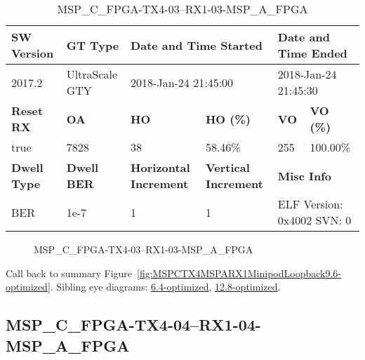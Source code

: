 \begin{table}[h]
\centering
\caption{MSP\_C\_FPGA-TX4-03--RX1-03-MSP\_A\_FPGA}
\label{tab:MSPCFPGATX403RX103MSPAFPGA9.6-optimized}
\begin{tabular}{@{}|l|l|l|l|l|l|@{}}
\toprule
\textbf{SW Version}                & \textbf{GT Type}   & \multicolumn{2}{l|}{\textbf{Date and Time Started}}            & \multicolumn{2}{l|}{\textbf{Date and Time Ended}}        \\ \midrule
2017.2                       & UltraScale GTY          & \multicolumn{2}{l|}{2018-Jan-24 21:45:00}                   & \multicolumn{2}{l|}{2018-Jan-24 21:45:30}               \\ \midrule
\textbf{Reset RX}                  & \textbf{OA} & \textbf{HO}   & \textbf{HO (\%)} & \textbf{VO} & \textbf{VO (\%)} \\ \midrule
true & 7828        & 38          & 58.46\%        & 255        & 100.00\%       \\ \midrule
\textbf{Dwell Type}                & \textbf{Dwell BER} & \textbf{Horizontal Increment} & \textbf{Vertical Increment}    & \multicolumn{2}{l|}{\textbf{Misc Info}}                  \\ \midrule
BER                            & 1e-7        & 1        & 1           & \multicolumn{2}{l|}{ELF Version: 0x4002 SVN: 0}                         \\ \bottomrule
\end{tabular}
\end{table}

\begin{figure}[h]
\caption{MSP\_C\_FPGA-TX4-03--RX1-03-MSP\_A\_FPGA} \label{fig:MSPCFPGATX403RX103MSPAFPGA9.6-optimized}
\end{figure}

Call back to summary Figure~\ref{fig:MSPCTX4MSPARX1MinipodLoopback9.6-optimized}.
Sibling eye diagrams: \hyperref[sec:MSPCFPGATX403RX103MSPAFPGA6.4-optimized]{6.4-optimized}, \hyperref[sec:MSPCFPGATX403RX103MSPAFPGA12.8-optimized]{12.8-optimized}.

\clearpage
\newpage


\subsection{MSP\_C\_FPGA-TX4-04--RX1-04-MSP\_A\_FPGA}\label{sec:MSPCFPGATX404RX104MSPAFPGA9.6-optimized}

